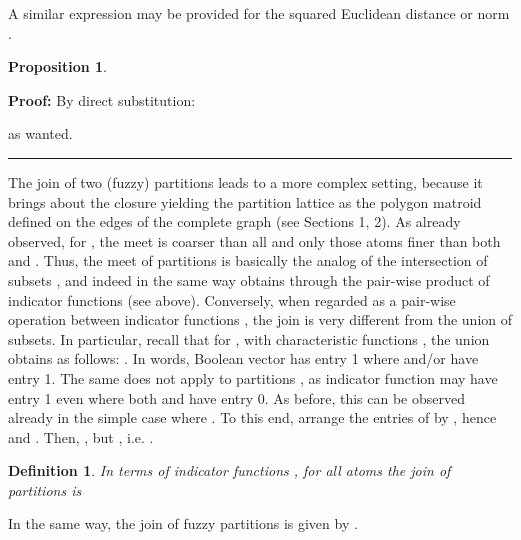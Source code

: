 \documentclass[a4paper,10pt]{article}
\newtheorem{definition}[theorem]{Definition}
\newtheorem{proposition}[theorem]{Proposition}
\newenvironment{proof}[1][Proof]{\noindent\textbf{#1: }}{\ \rule{0.5em}{0.5em}}
\begin{document}
A similar expression may be provided for the squared Euclidean distance or  norm .

\begin{proposition}


\end{proposition}

\begin{proof}
By direct substitution: 

 as wanted.
\end{proof}

The join  of two (fuzzy) partitions leads to a more complex setting, because it brings about the closure yielding the partition lattice as the
polygon matroid defined on the edges of the complete graph  (see Sections 1, 2). As already observed, for , the meet
 is coarser than all and only those atoms
 finer than both  and . Thus, the meet of partitions is basically the analog of the intersection of subsets , and indeed
in the same way obtains through the pair-wise product of indicator functions  (see above). Conversely, when regarded as a pair-wise operation between indicator
functions , the join is very different from the union of subsets. In particular, recall that for , with characteristic functions
, the union  obtains as follows: .
In words, Boolean vector  has entry 1 where  and/or  have entry 1. The same does not apply to partitions ,
as indicator function  may have entry 1 even where both  and  have entry 0. As before,
this can be observed already in the simple case where . To this end, arrange the entries of  by
, hence  and
. Then,
, but ,
i.e. .

\begin{definition}
In terms of indicator functions , for all atoms 
the join  of partitions  is

\end{definition}

In the same way, the join  of fuzzy partitions  is given by
.
\end{document}
